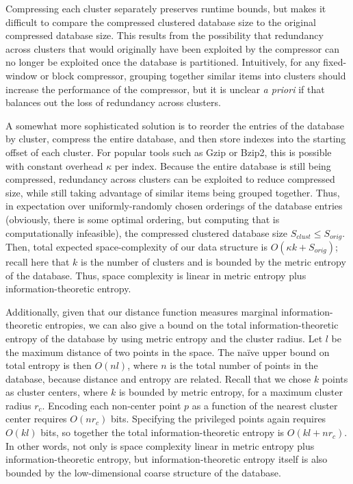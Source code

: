 \documentclass[review,preprint,12pt]{elsarticle}
\theoremstyle{definition}
\theoremstyle{remark}
\begin{document}
Compressing each cluster separately preserves runtime bounds, but makes it difficult to compare the compressed clustered database size to the original compressed database size.
This results from the possibility that redundancy across clusters that would originally have been exploited by the compressor can no longer be exploited 
once the database is partitioned.
Intuitively, for any fixed-window or block compressor, grouping together similar items into clusters should increase the performance of the compressor, but it is unclear \textit{a priori} if that balances out the loss of redundancy across clusters.

A somewhat more sophisticated solution is to reorder the entries of the database by cluster, compress the entire database, and then store indexes into the starting offset of each cluster.
For popular tools such as Gzip or Bzip2, this is possible with constant overhead $\kappa$ per index.
Because the entire database is still being compressed, redundancy across clusters can be exploited to reduce compressed size, while still taking advantage of similar items being grouped together.
Thus, in expectation over uniformly-randomly chosen orderings of the database entries (obviously, there is some optimal ordering, but computing that is computationally infeasible), the compressed clustered database size $S_{clust} \le S_{orig}$.
Then, total expected space-complexity of our data structure is $O(\kappa k + S_{orig})$; recall here that $k$ is the number of clusters and is bounded by the metric entropy of the database.
Thus, space complexity is linear in metric entropy plus information-theoretic entropy.

Additionally, given that our distance function measures marginal information-theoretic entropies, we can also give a bound on the total information-theoretic entropy of the database by using metric entropy and the cluster radius.
Let $l$ be the maximum distance of two points in the space.
The na\"ive upper bound on total entropy is then $O(nl)$, where $n$ is the total number of points in the database, because distance and entropy are related.
Recall that we chose $k$ points as cluster centers, where $k$ is bounded by metric entropy, for a maximum cluster radius $r_c$.
Encoding each non-center point $p$ as a function of the nearest cluster center requires $O(n  r_c)$ bits.
Specifying the privileged points again requires $O(kl)$ bits, so together the total information-theoretic entropy is $O(kl + n r_c)$.
In other words, not only is space complexity linear in metric entropy plus information-theoretic entropy, but information-theoretic entropy itself is also bounded by the low-dimensional coarse structure of the database.
\end{document}
